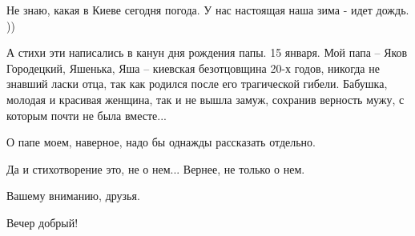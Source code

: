 Не знаю, какая в Киеве сегодня погода. У нас настоящая наша зима - идет дождь.
))

А стихи эти написались в канун дня рождения папы. 15 января. Мой  папа – Яков
Городецкий, Яшенька,  Яша – киевская безотцовщина  20-х годов, никогда не
знавший ласки отца, так как родился после его трагической гибели. Бабушка,
молодая и красивая  женщина,  так и не вышла замуж, сохранив верность  мужу, с
которым почти не была вместе...

О папе моем, наверное, надо бы однажды рассказать отдельно.

Да и стихотворение это, не о нем... Вернее, не только о нем.

Вашему вниманию, друзья.

Вечер добрый!
